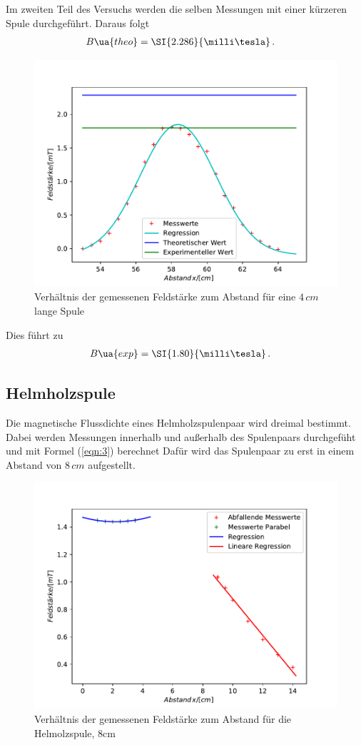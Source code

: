 Im zweiten Teil des Versuchs werden die selben Messungen mit einer kürzeren Spule
durchgeführt. Daraus folgt
\begin{align}
B\ua{theo} &= \SI{2.286}{\milli\tesla}\,.
\end{align}
\begin{figure}
  \centering
  \includegraphics[width = 12 cm]{Spuleklein2.pdf}
  \caption{Verhältnis der gemessenen Feldstärke zum Abstand für eine $4\,cm$ lange Spule}
  \label{fig:Messunga}
\end{figure}
Dies führt zu
\begin{align}
B\ua{exp} &= \SI{1.80}{\milli\tesla}\,.
\end{align}
\newpage

\subsection{Helmholzspule}
Die magnetische Flussdichte eines Helmholzspulenpaar wird dreimal bestimmt.
Dabei werden Messungen innerhalb und außerhalb des Spulenpaars durchgefüht
und mit Formel (\ref{eqn:3}) berechnet
Dafür wird das Spulenpaar zu erst in einem Abstand von $8 \, cm$ aufgestellt.

\begin{figure}
  \centering
  \includegraphics[width = 12 cm]{Helmholzspule8.pdf}
  \caption{Verhältnis der gemessenen Feldstärke zum Abstand für die Helmolzspule, 8cm}
  \label{fig:Messungb}
\end{figure}

